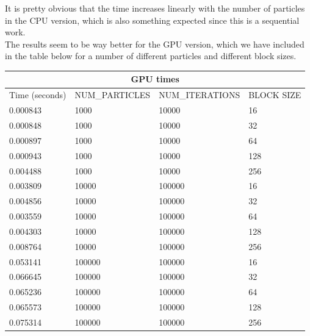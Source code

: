 \documentclass[english]{exam}
\begin{document}
{\noindent
It is pretty obvious that the time increases linearly with the number of particles in the CPU version, which is also something expected since this is a sequential work.\\
The results seem to be way better for the GPU version, which we have included in the table below for a number of different particles and different block sizes.\\

\begin{center}
    \begin{tabular}{ |p{3cm}||p{3cm}|p{3cm}|p{3cm}|  }
    \hline
    \multicolumn{4}{|c|}{GPU times} \\
    \hline
    Time (seconds)& NUM\_PARTICLES& NUM\_ITERATIONS&BLOCK SIZE\\
    \hline
    0.000843& 1000& 10000& 16\\
    0.000848& 1000& 10000& 32\\
    0.000897& 1000& 10000& 64\\
    0.000943& 1000& 10000& 128\\
    0.004488& 1000& 10000& 256\\
    0.003809& 10000& 100000& 16\\
    0.004856& 10000& 100000& 32\\
    0.003559& 10000& 100000& 64\\
    0.004303& 10000& 100000& 128\\
    0.008764& 10000& 100000& 256\\
    0.053141& 100000& 100000& 16\\
    0.066645& 100000& 100000& 32\\
    0.065236& 100000& 100000& 64\\
    0.065573& 100000& 100000& 128\\
    0.075314& 100000& 100000& 256\\
    \hline
  \end{tabular}
\end{center}

}
\end{document}
